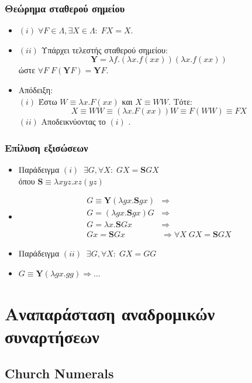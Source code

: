 \documentclass{beamer}
\begin{document}
\begin{frame}
  \frametitle{Θεώρημα σταθερού σημείου}
  \begin{itemize}
  \item $ (i) \; \forall F \in \Lambda , \exists X \in \Lambda: \; F X
    = X. $ \pause
  \item $ (ii) $ Υπάρχει τελεστής σταθερού σημείου:
    \[ \textbf{Y} = \lambda f . (\lambda x . f (xx)) (\lambda x . f (xx)) \]
    ώστε $ \forall F \; F (\textbf{Y} F) = \textbf{Y} F $. \pause
  \item Απόδειξη: \\
    $ (i) $ Έστω $ W \equiv \lambda x . F (xx) $ και $ X \equiv W W $. Τότε:
    \[ X \equiv W W \equiv (\lambda x . F (xx)) W \equiv F (WW) \equiv F X \] \pause
    $ (ii) $ Αποδεικνύοντας το $ (i) $ .
  \end{itemize}
\end{frame}

\begin{frame}
  \frametitle{Επίλυση εξισώσεων}
  \begin{itemize}
  \item Παράδειγμα $(i) \; \; \exists G, \forall X: \; G X =
    \textbf{S} G X $ \\ όπου $ \textbf{S} \equiv \lambda x y z . x z
    (y z) $ \pause
  \item $$ \begin{array}{ll}
    G \equiv \textbf{Y} (\lambda g x. \textbf{S} g x) & \Rightarrow  \\
    G = (\lambda g x. \textbf{S} g x) G & \Rightarrow  \\
    G = \lambda x . \textbf{S} G x & \Rightarrow  \\
    G x = \textbf{S} G x & \Rightarrow \forall X \; G X = \textbf{S} G X
  \end{array} $$  \pause
  \item Παράδειγμα $(ii) \; \; \exists G, \forall X: \; G X = G G $
    \pause
  \item $ G \equiv \textbf{Y} (\lambda g x. g g) \Rightarrow \ldots $
  \end{itemize}
\end{frame}

\section{Αναπαράσταση αναδρομικών συναρτήσεων}

\subsection{Church Numerals}
\end{document}
